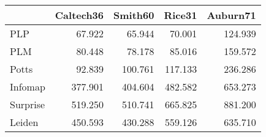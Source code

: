 \begin{tabular}{lrrrr}
\toprule
{} & Caltech36 & Smith60 &  Rice31 & Auburn71 \\
\midrule
PLP      &    67.922 &  65.944 &  70.001 &  124.939 \\
PLM      &    80.448 &  78.178 &  85.016 &  159.572 \\
Potts    &    92.839 & 100.761 & 117.133 &  236.286 \\
Infomap  &   377.901 & 404.604 & 482.582 &  653.273 \\
Surprise &   519.250 & 510.741 & 665.825 &  881.200 \\
Leiden   &   450.593 & 430.288 & 559.126 &  635.710 \\
\bottomrule
\end{tabular}
